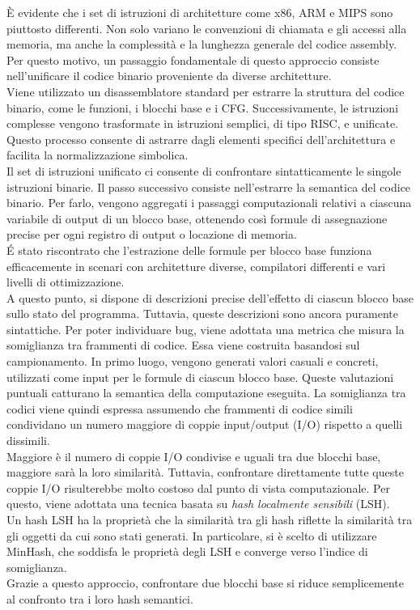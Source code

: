 \documentclass[12pt,a4paper,openright,twoside]{report}
\begin{document}
È evidente che i set di istruzioni di architetture come x86, ARM e MIPS sono piuttosto differenti. Non solo variano le convenzioni di chiamata e gli accessi alla memoria, ma anche la complessità e la lunghezza generale del codice assembly. Per questo motivo, un passaggio fondamentale di questo approccio consiste nell’unificare il codice binario proveniente da diverse architetture.\\
Viene utilizzato un disassemblatore standard per estrarre la struttura del codice binario, come le funzioni, i blocchi base e i CFG. Successivamente, le istruzioni complesse vengono trasformate in istruzioni semplici, di tipo RISC, e unificate. Questo processo consente di astrarre dagli elementi specifici dell’architettura e facilita la normalizzazione simbolica.\\
Il set di istruzioni unificato ci consente di confrontare sintatticamente le singole istruzioni binarie. Il passo successivo consiste nell’estrarre la semantica del codice binario. Per farlo, vengono aggregati i passaggi computazionali relativi a ciascuna variabile di output di un blocco base, ottenendo così formule di assegnazione precise per ogni registro di output o locazione di memoria.\\
É stato riscontrato che l’estrazione delle formule per blocco base funziona efficacemente in scenari con architetture diverse, compilatori differenti e vari livelli di ottimizzazione.\\
A questo punto, si dispone di descrizioni precise dell’effetto di ciascun blocco base sullo stato del programma. Tuttavia, queste descrizioni sono ancora puramente sintattiche. Per poter individuare bug, viene adottata una metrica che misura la somiglianza tra frammenti di codice.
Essa viene costruita basandosi sul campionamento. In primo luogo, vengono generati valori casuali e concreti, utilizzati come input per le formule di ciascun blocco base. Queste valutazioni puntuali catturano la semantica della computazione eseguita. La somiglianza tra codici viene quindi espressa assumendo che frammenti di codice simili condividano un numero maggiore di coppie input/output (I/O) rispetto a quelli dissimili.\\
Maggiore è il numero di coppie I/O condivise e uguali tra due blocchi base, maggiore sarà la loro similarità. Tuttavia, confrontare direttamente tutte queste coppie I/O risulterebbe molto costoso dal punto di vista computazionale. Per questo, viene adottata una tecnica basata su \textit{hash localmente sensibili} (LSH).\\
Un hash LSH ha la proprietà che la similarità tra gli hash riflette la similarità tra gli oggetti da cui sono stati generati. In particolare, si è scelto di utilizzare MinHash, che soddisfa le proprietà degli LSH e converge verso l’indice di somiglianza.\\
Grazie a questo approccio, confrontare due blocchi base si riduce semplicemente al confronto tra i loro hash semantici.
\end{document}
